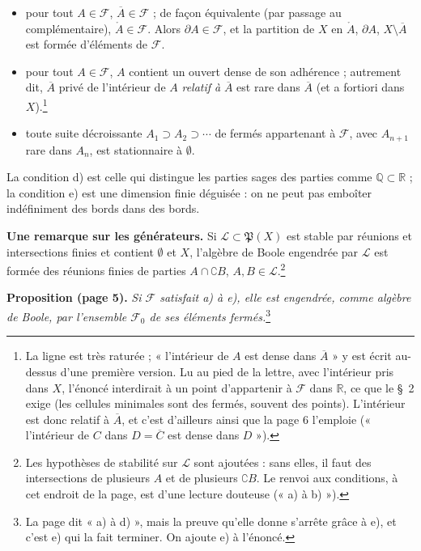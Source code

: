 \documentclass[11pt,a4paper]{article}
\begin{document}
\begin{itemize}
\item[c~bis)] pour tout $A \in \mathcal{F}$, $\overline{A} \in \mathcal{F}$ ;
  de façon équivalente (par passage au complémentaire), $\mathring{A} \in
  \mathcal{F}$. Alors $\partial A \in \mathcal{F}$, et la partition de $X$ en
  $\mathring{A}$, $\partial A$, $X \setminus \overline{A}$ est formée
  d'éléments de $\mathcal{F}$.
\item[d)] pour tout $A \in \mathcal{F}$, $A$ contient un ouvert dense de son
  adhérence ; autrement dit, $\overline{A}$ privé de l'intérieur de $A$
  \emph{relatif à} $\overline{A}$ est rare dans $\overline{A}$ (et a fortiori
  dans $X$).\footnote{La ligne est très raturée ; « l'intérieur de $A$ est
  dense dans $\overline{A}$ » y est écrit au-dessus d'une première version.
  Lu au pied de la lettre, avec l'intérieur pris dans $X$, l'énoncé
  interdirait à un point d'appartenir à $\mathcal{F}$ dans $\mathbb{R}$, ce
  que le §~2 exige (les cellules minimales sont des fermés, souvent des
  points). L'intérieur est donc relatif à $\overline{A}$, et c'est d'ailleurs
  ainsi que la page 6 l'emploie (« l'intérieur de $C$ dans
  $D = \overline{C}$ est dense dans $D$ »).}
\item[e)] toute suite décroissante $A_1 \supset A_2 \supset \cdots$ de
  fermés appartenant à $\mathcal{F}$, avec $A_{n+1}$ rare dans $A_n$, est
  stationnaire à $\emptyset$.
\end{itemize}

La condition d) est celle qui distingue les parties sages des parties comme
$\mathbb{Q} \subset \mathbb{R}$ ; la condition e) est une dimension finie
déguisée : on ne peut pas emboîter indéfiniment des bords dans des bords.

\textbf{Une remarque sur les générateurs.} Si $\mathcal{L} \subset
\mathfrak{P}(X)$ est stable par réunions et intersections finies et contient
$\emptyset$ et $X$, l'algèbre de Boole engendrée par $\mathcal{L}$ est formée
des réunions finies de parties $A \cap \complement B$, $A, B \in
\mathcal{L}$.\footnote{Les hypothèses de stabilité sur $\mathcal{L}$ sont
ajoutées : sans elles, il faut des intersections de plusieurs $A$ et de
plusieurs $\complement B$. Le renvoi aux conditions, à cet endroit de la page,
est d'une lecture douteuse (« a) à b) »).}

\textbf{Proposition (page 5).} \emph{Si $\mathcal{F}$ satisfait a) à e), elle
est engendrée, comme algèbre de Boole, par l'ensemble $\mathcal{F}_0$ de ses
éléments fermés.}\footnote{La page dit « a) à d) », mais la preuve qu'elle
donne s'arrête grâce à e), et c'est e) qui la fait terminer. On ajoute e) à
l'énoncé.}
\end{document}

